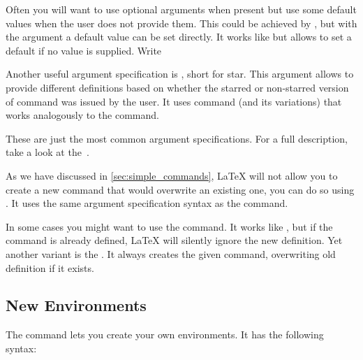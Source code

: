 Often you will want to use optional arguments when present but use some default
values when the user does not provide them. This could be achieved by
, but with the  argument a default value can be set directly.
It works like  but allows to set a default
if no value is supplied. Write


Another useful argument specification is , short for star. This
argument allows to provide different definitions based on whether the
starred or non-starred version of command was issued by the user. It uses
 command (and its variations)
that works analogously to the  command.

\begin{chktexignore}
\end{chktexignore}

These are just the most common argument specifications. For a full description,
take a look at the~\cite{usrguide3}.

As we have discussed in \autoref{sec:simple_commands}, \LaTeX{} will not allow
you to create a new command that would overwrite an existing one, you can do so
using . It uses the same argument specification
syntax as the  command.

In some cases you might want to use the  command.
It works like , but if the command is already defined,
\LaTeX{} will silently ignore the new definition. Yet another variant is the
. It always creates the given command, overwriting
old definition if it exists.

\subsection{New Environments}
The  command lets you create your own environments. It has the
following syntax:

